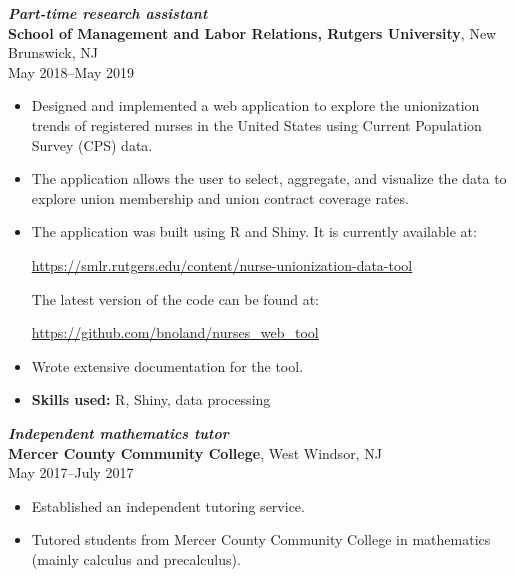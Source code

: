 \documentclass[letterpaper,12pt]{article}
\begin{document}
\textit{\textbf{Part-time research assistant}} \\
\textbf{School of Management and Labor Relations, Rutgers University},
New Brunswick, NJ \\
May 2018--May 2019
\begin{itemize}
\item Designed and implemented a web application to explore the
  unionization trends of registered nurses in the United States using
  Current Population Survey (CPS) data.
\item The application allows the user to select, aggregate, and
  visualize the data to explore union membership and union contract
  coverage rates.
\item The application was built using R and Shiny. It is currently
  available at:
  \begin{center}
    \url{https://smlr.rutgers.edu/content/nurse-unionization-data-tool}
  \end{center}
  The latest version of the code can be found at:
  \begin{center}
    \url{https://github.com/bnoland/nurses_web_tool}
  \end{center}
\item Wrote extensive documentation for the tool.
\item \textbf{Skills used:} R, Shiny, data processing
\end{itemize}

\textit{\textbf{Independent mathematics tutor}} \\
\textbf{Mercer County Community College},
West Windsor, NJ \\
May 2017--July 2017
\begin{itemize}
\item Established an independent tutoring service.
\item Tutored students from Mercer County Community College in
  mathematics (mainly calculus and precalculus).
\end{itemize}
\end{document}
